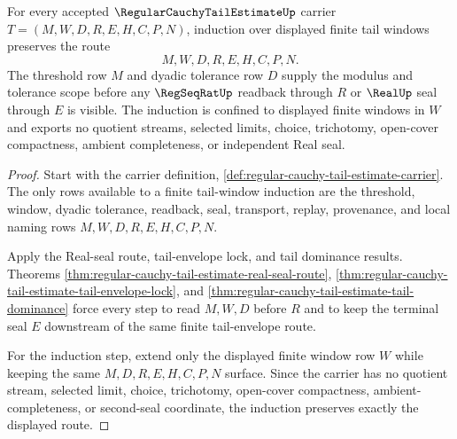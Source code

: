 \begin{theorem}
\label{thm:regular-cauchy-tail-estimate-tail-induction-scope}
For every accepted $\RegularCauchyTailEstimateUp$ carrier
$T=(M,W,D,R,E,H,C,P,N)$, induction over displayed finite tail windows preserves the route
$$
M,W,D,R,E,H,C,P,N .
$$
The threshold row $M$ and dyadic tolerance row $D$ supply the modulus and tolerance scope before any $\RegSeqRatUp$ readback through $R$ or $\RealUp$ seal through $E$ is visible. The induction is confined to displayed finite windows in $W$ and exports no quotient streams, selected limits, choice, trichotomy, open-cover compactness, ambient completeness, or independent Real seal.
\end{theorem}
\begin{proof}
Start with the carrier definition, \autoref{def:regular-cauchy-tail-estimate-carrier}. The only rows available to a finite tail-window induction are the threshold, window, dyadic tolerance, readback, seal, transport, replay, provenance, and local naming rows $M,W,D,R,E,H,C,P,N$.

Apply the Real-seal route, tail-envelope lock, and tail dominance results. Theorems \autoref{thm:regular-cauchy-tail-estimate-real-seal-route}, \autoref{thm:regular-cauchy-tail-estimate-tail-envelope-lock}, and \autoref{thm:regular-cauchy-tail-estimate-tail-dominance} force every step to read $M,W,D$ before $R$ and to keep the terminal seal $E$ downstream of the same finite tail-envelope route.

For the induction step, extend only the displayed finite window row $W$ while keeping the same $M,D,R,E,H,C,P,N$ surface. Since the carrier has no quotient stream, selected limit, choice, trichotomy, open-cover compactness, ambient-completeness, or second-seal coordinate, the induction preserves exactly the displayed route.
\end{proof}

